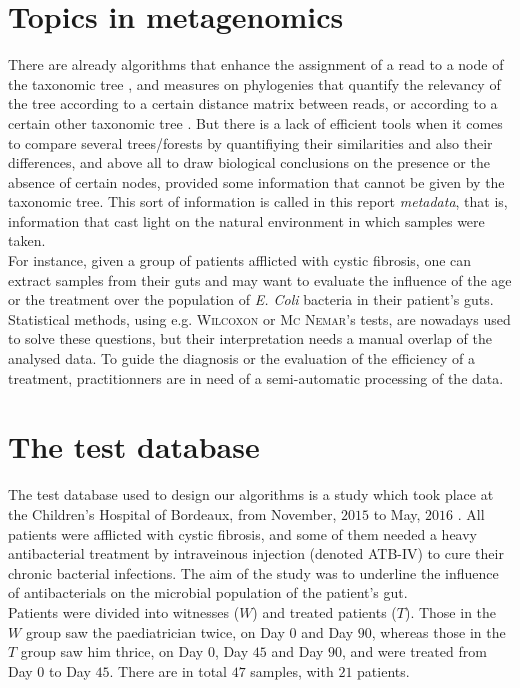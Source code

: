 \documentclass{report}
\begin{document}
\section{Topics in metagenomics}

There are already algorithms that enhance the assignment of a read to a node of the taxonomic tree \cite{Tango1}, and measures on phylogenies that quantify the relevancy of the tree according to a certain distance matrix between reads, or according to a certain other taxonomic tree \cite{RobinsonFoulds} \cite{Alignment}. But there is a lack of efficient tools \cite{Enaud} when it comes to compare several trees/forests by quantifiying their similarities and also their differences, and above all to draw biological conclusions on the presence or the absence of certain nodes, provided some information that cannot be given by the taxonomic tree. This sort of information is called in this report \emph{metadata}, that is, information that cast light on the natural environment in which samples were taken.\\

For instance, given a group of patients afflicted with cystic fibrosis, one can extract samples from their guts and may want to evaluate the influence of the age or the treatment over the population of \emph{E. Coli} bacteria in their patient's guts. Statistical methods, using e.g. \textsc{Wilcoxon} \cite{Wilcoxon} \cite{Whitney} or \textsc{Mc Nemar}'s \cite{McNemar} tests, are nowadays used to solve these questions, but their interpretation needs a manual overlap of the analysed data. To guide the diagnosis or the evaluation of the efficiency of a treatment, practitionners are in need of a semi-automatic processing of the data.

\section{The test database}

The test database used to design our algorithms is a study which took place at the Children's Hospital of Bordeaux, from November, $2015$ to May, $2016$ \cite{Enaud}. All patients were afflicted with cystic fibrosis, and some of them needed a heavy antibacterial treatment by intraveinous injection (denoted ATB-IV) to cure their chronic bacterial infections. The aim of the study was to underline the influence of antibacterials on the microbial population of the patient's gut.\\

Patients were divided into witnesses ($W$) and treated patients ($T$). Those in the $W$ group saw the paediatrician twice, on Day $0$ and Day $90$, whereas those in the $T$ group saw him thrice, on Day $0$, Day $45$ and Day $90$, and were treated from Day $0$ to Day $45$. There are in total $47$ samples, with $21$ patients.\\
\end{document}
